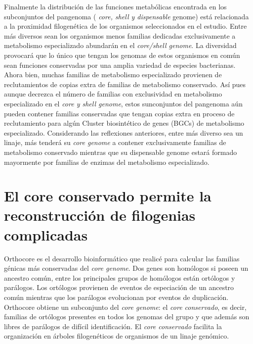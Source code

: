 \documentclass[12pt,twoside]{reedthesis}
\begin{document}
  Finalmente la distribución de las funciones metabólicas encontrada en
  los subconjuntos del pangenoma ( \emph{core, shell y dispensable}
  genome) está relacionada a la proximidad filogenética de los organismos
  seleccionados en el estudio. Entre más diversos sean los organismos
  menos familias dedicadas exclusivamente a metabolismo especializado
  abundarán en el \emph{core/shell genome}. La diversidad provocará que lo
  único que tengan los genomas de estos organismos en común sean funciones
  conservadas por una amplia variedad de especies bacterianas. Ahora bien,
  muchas familias de metabolismo especializado provienen de reclutamientos
  de copias extra de familias de metabolismo conservado. Así pues aunque
  decrezca el número de familias con exclusividad en metabolismo
  especializado en el \emph{core y shell genome}, estos sunconjuntos del
  pangenoma aún pueden contener familias conservadas que tengan copias
  extra en proceso de reclutamiento para algún Cluster biosintético de
  genes (BGCs) de metabolismo especializado. Considerando las reflexiones
  anteriores, entre más diverso sea un linaje, más tenderá su \emph{core
  genome} a contener exclusivamente familias de metabolismo conservado
  mientras que su dispensable genome estará formado mayormente por
  familias de enzimas del metabolismo especializado.
  
  \section{El core conservado permite la reconstrucción de filogenias
  complicadas}\label{el-core-conservado-permite-la-reconstruccion-de-filogenias-complicadas}
  
  Orthocore es el desarrollo bioinformático que realicé para calcular las
  familias génicas más conservadas del \emph{core genome}. Dos genes son
  homólogos si poseen un ancestro común, entre los principales grupos de
  homólogos están ortólogos y parálogos. Los ortólogos provienen de
  eventos de especiación de un ancestro común mientras que los parálogos
  evolucionan por eventos de duplicación. Orthocore obtiene un subconjunto
  del \emph{core genome}: el \emph{core conservado}, es decir, familias de
  ortólogos presentes en todos los genomas del grupo y que además son
  libres de parálogos de difícil identificación. El \emph{core conservado}
  facilita la organización en árboles filogenéticos de organismos de un
  linaje genómico.
  
\end{document}
